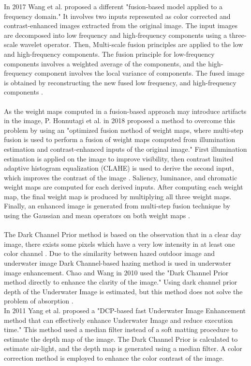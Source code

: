 \documentclass[a4paper,11pt,oneside]{article}
\begin{document}
  In 2017 Wang et al. \cite{12} proposed a different "fusion-based model applied to a frequency domain." It involves two inputs represented as color corrected and contrast-enhanced images extracted from the original image. The input images are decomposed into low frequency and high-frequency components using a three-scale wavelet operator. Then, Multi-scale fusion principles are applied to the low and high-frequency components. The fusion principle for low-frequency components involves a weighted average of the components, and the high-frequency component involves the local variance of components. The fused image is obtained by reconstructing the new fused low frequency, and high-frequency components \cite{12}.\\
  \\
  As the weight maps computed in a fusion-based approach may introduce artifacts in the image, P. Honnutagi et al. in 2018 \cite{10} proposed a method to overcome this problem by using an "optimized fusion method of weight maps, where multi-step fusion is used to perform a fusion of weight maps computed from illumination estimation and contrast-enhanced inputs of the original image." First illumination estimation is applied on the image to improve visibility, then contrast limited adaptive histogram equalization (CLAHE) is used to derive the second input, which improves the contrast of the image \cite{10}. Saliency, luminance, and chromatic weight maps are computed for each derived inputs. After computing each weight map, the final weight map is produced by multiplying all three weight maps. Finally, an enhanced image is generated from multi-step fusion technique by using the Gaussian and mean operators on both weight maps \cite{10}.\\
  \\
  The Dark Channel Prior method is based on the observation that in a clear day image, there exists some pixels which have a very low intensity in at least one color channel \cite{15}. Due to the similarity between hazed outdoor image and underwater image Dark Channel-based hazing method is used in underwater image enhancement. Chao and Wang in 2010 \cite{25} used the "Dark Channel Prior method directly to enhance the clarity of the image." Using dark channel prior depth of the Underwater Image is estimated, but this method does not solve the problem of absorption \cite{25}.\\
 In 2011 Yang et al. \cite{8} proposed a "DCP-based fast Underwater Image Enhancement method that can effectively enhance Underwater Image and reduce execution time." This method used a median filter instead of a soft matting procedure to estimate the depth map of the image. The Dark Channel Prior is calculated to estimate air-light, and the depth map is generated using a median filter. A color correction method is employed to enhance the color contrast of the image.\cite{8}\\
\end{document}
